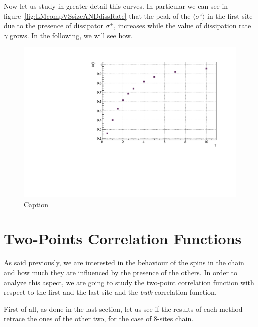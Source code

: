 Now let us study in greater detail this curves. In particular we can see in figure~\ref{fig:LMcompVSsizeANDdissRate} that the peak of the $\langle \sigma^z \rangle$ in the first site due to the presence of dissipator $\sigma^+$, increases while the value of dissipation rate $\gamma$ grows. In the following, we will see how.

\begin{figure}[H]
    \centering
    \includegraphics[scale=0.8]{Figures/8sites_PeakLMvsGamma_J1051.pdf}
    \caption{Caption}
    \label{fig:PeakLMvsGamma_J1051}
\end{figure}


\section{Two-Points Correlation Functions}
As said previously, we are interested in the behaviour of the spins in the chain and how much they are influenced by the presence of the others. In order to analyze this aspect, we are going to study the two-point correlation function with respect to the first and the last site and the \emph{bulk} correlation function.

First of all, as done in the last section, let us see if the results of each method retrace the ones of the other two, for the case of 8-sites chain. 

